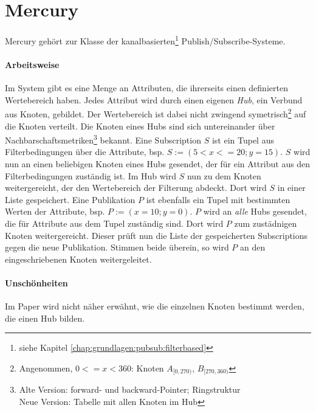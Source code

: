 \section{Mercury}
\label{chap:related:mercury}
Mercury \cite{citeulike:854573} gehört zur Klasse der kanalbasierten\footnote{siehe Kapitel \ref{chap:grundlagen:pubsub:filterbased}} Publish/Subscribe-Systeme.

\paragraph{Arbeitsweise}
Im System gibt es eine Menge an Attributen, die ihrerseits einen definierten Wertebereich haben. Jedes Attribut wird durch einen eigenen \emph{Hub}, ein Verbund aus Knoten, gebildet. Der Wertebereich ist dabei nicht zwingend symetrisch\footnote{Angenommen, $0<=x<360$: Knoten $A_{[0,270)}$, $B_{[270, 360)}$} auf die Knoten verteilt. Die Knoten eines Hubs sind sich untereinander über Nachbarschaftsmetriken\footnote{Alte Version: forward- und backward-Pointer; Ringstruktur\\Neue Version: Tabelle mit allen Knoten im Hub} bekannt.
Eine Subscription $S$ ist ein Tupel aus Filterbedingungen über die Attribute, bsp. $S := (5 < x <= 20; y = 15)$. $S$ wird nun an einen beliebigen Knoten eines Hubs gesendet, der für ein Attribut aus den Filterbedingungen zuständig ist. Im Hub wird $S$ nun zu dem Knoten weitergereicht, der den Wertebereich der Filterung abdeckt. Dort wird $S$ in einer Liste gespeichert.
Eine Publikation $P$ ist ebenfalls ein Tupel mit bestimmten Werten der Attribute, bsp. $P := (x = 10; y = 0)$. $P$ wird an \emph{alle} Hubs gesendet, die für Attribute aus dem Tupel zuständig sind. Dort wird $P$ zum zustädnigen Knoten weitergereicht. Dieser prüft nun die Liste der gespeicherten Subscriptions gegen die neue Publikation. Stimmen beide überein, so wird $P$ an den eingeschriebenen Knoten weitergeleitet.

\paragraph{Unschönheiten}
Im Paper wird nicht näher erwähnt, wie die einzelnen Knoten bestimmt werden, die einen Hub bilden.
